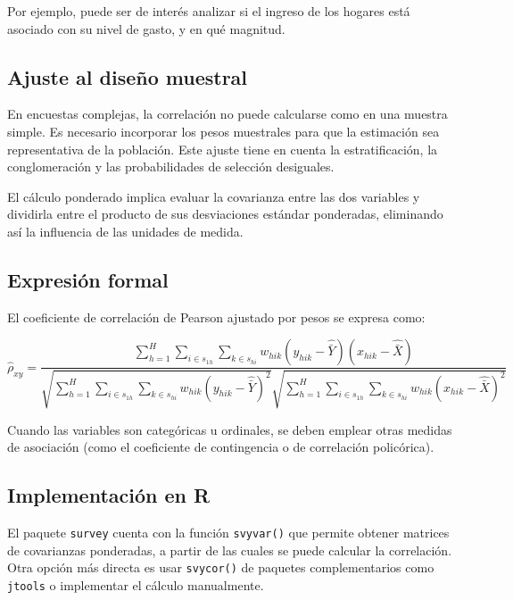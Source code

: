 \documentclass[
  spanish,
  12pt,
]{book}
\begin{document}
Por ejemplo, puede ser de interés analizar si el ingreso de los hogares está asociado con su nivel de gasto, y en qué magnitud.

\subsection{Ajuste al diseño muestral}\label{ajuste-al-diseuxf1o-muestral}

En encuestas complejas, la correlación no puede calcularse como en una muestra simple. Es necesario incorporar los pesos muestrales para que la estimación sea representativa de la población. Este ajuste tiene en cuenta la estratificación, la conglomeración y las probabilidades de selección desiguales.

El cálculo ponderado implica evaluar la covarianza entre las dos variables y dividirla entre el producto de sus desviaciones estándar ponderadas, eliminando así la influencia de las unidades de medida.

\subsection{Expresión formal}\label{expresiuxf3n-formal}

El coeficiente de correlación de Pearson ajustado por pesos se expresa como:

\[\hat{\rho}_{xy} = \frac{\displaystyle \sum_{h=1}^{H} \sum_{i \in s_{1h}} \sum_{k \in s_{hi}} w_{hik} (y_{hik} - \widehat{\bar{Y}})(x_{hik} - \widehat{\bar{X}})} {\sqrt{\displaystyle \sum_{h=1}^{H} \sum_{i \in s_{1h}} \sum_{k \in s_{hi}} w_{hik} (y_{hik} - \widehat{\bar{Y}})^2} \sqrt{\displaystyle \sum_{h=1}^{H} \sum_{i \in s_{1h}} \sum_{k \in s_{hi}} w_{hik} (x_{hik} - \widehat{\bar{X}})^2}}\]

Cuando las variables son categóricas u ordinales, se deben emplear otras medidas de asociación (como el coeficiente de contingencia o de correlación policórica).

\subsection{Implementación en R}\label{implementaciuxf3n-en-r}

El paquete \texttt{survey} cuenta con la función \texttt{svyvar()} que permite obtener matrices de covarianzas ponderadas, a partir de las cuales se puede calcular la correlación. Otra opción más directa es usar \texttt{svycor()} de paquetes complementarios como \texttt{jtools} o implementar el cálculo manualmente.
\end{document}

